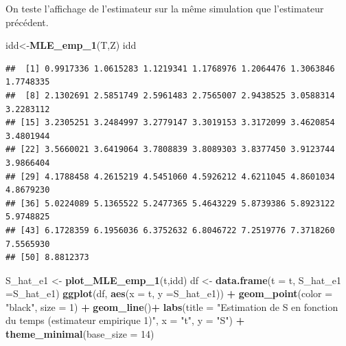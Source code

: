 \documentclass[
]{article}
\newenvironment{Shaded}{\begin{snugshade}}{\end{snugshade}}
\newcommand{\AttributeTok}[1]{\textcolor[rgb]{0.13,0.29,0.53}{#1}}
\newcommand{\DecValTok}[1]{\textcolor[rgb]{0.00,0.00,0.81}{#1}}
\newcommand{\FunctionTok}[1]{\textcolor[rgb]{0.13,0.29,0.53}{\textbf{#1}}}
\newcommand{\NormalTok}[1]{#1}
\newcommand{\OtherTok}[1]{\textcolor[rgb]{0.56,0.35,0.01}{#1}}
\newcommand{\SpecialCharTok}[1]{\textcolor[rgb]{0.81,0.36,0.00}{\textbf{#1}}}
\newcommand{\StringTok}[1]{\textcolor[rgb]{0.31,0.60,0.02}{#1}}
\begin{document}
On teste l'affichage de l'estimateur sur la même simulation que
l'estimateur précédent.

\begin{Shaded}
\begin{Highlighting}[]
\NormalTok{idd}\OtherTok{\textless{}{-}}\FunctionTok{MLE\_emp\_1}\NormalTok{(T,Z)}
\NormalTok{idd}
\end{Highlighting}
\end{Shaded}

\begin{verbatim}
##  [1] 0.9917336 1.0615283 1.1219341 1.1768976 1.2064476 1.3063846 1.7748335
##  [8] 2.1302691 2.5851749 2.5961483 2.7565007 2.9438525 3.0588314 3.2283112
## [15] 3.2305251 3.2484997 3.2779147 3.3019153 3.3172099 3.4620854 3.4801944
## [22] 3.5660021 3.6419064 3.7808839 3.8089303 3.8377450 3.9123744 3.9866404
## [29] 4.1788458 4.2615219 4.5451060 4.5926212 4.6211045 4.8601034 4.8679230
## [36] 5.0224089 5.1365522 5.2477365 5.4643229 5.8739386 5.8923122 5.9748825
## [43] 6.1728359 6.1956036 6.3752632 6.8046722 7.2519776 7.3718260 7.5565930
## [50] 8.8812373
\end{verbatim}

\begin{Shaded}
\begin{Highlighting}[]
\NormalTok{S\_hat\_e1 }\OtherTok{\textless{}{-}} \FunctionTok{plot\_MLE\_emp\_1}\NormalTok{(t,idd)}
\NormalTok{df }\OtherTok{\textless{}{-}} \FunctionTok{data.frame}\NormalTok{(}\AttributeTok{t =}\NormalTok{ t, }\AttributeTok{S\_hat\_e1 =}\NormalTok{S\_hat\_e1)}
\FunctionTok{ggplot}\NormalTok{(df, }\FunctionTok{aes}\NormalTok{(}\AttributeTok{x =}\NormalTok{ t, }\AttributeTok{y =}\NormalTok{S\_hat\_e1)) }\SpecialCharTok{+}
  \FunctionTok{geom\_point}\NormalTok{(}\AttributeTok{color =} \StringTok{"black"}\NormalTok{, }\AttributeTok{size =} \DecValTok{1}\NormalTok{) }\SpecialCharTok{+}       
  \FunctionTok{geom\_line}\NormalTok{()}\SpecialCharTok{+}
  \FunctionTok{labs}\NormalTok{(}\AttributeTok{title =} \StringTok{"Estimation de S en fonction du temps (estimateur empirique 1)"}\NormalTok{,}
       \AttributeTok{x =} \StringTok{"t"}\NormalTok{,}
       \AttributeTok{y =} \StringTok{"S"}\NormalTok{) }\SpecialCharTok{+}
  \FunctionTok{theme\_minimal}\NormalTok{(}\AttributeTok{base\_size =} \DecValTok{14}\NormalTok{)}
\end{Highlighting}
\end{Shaded}
\end{document}
